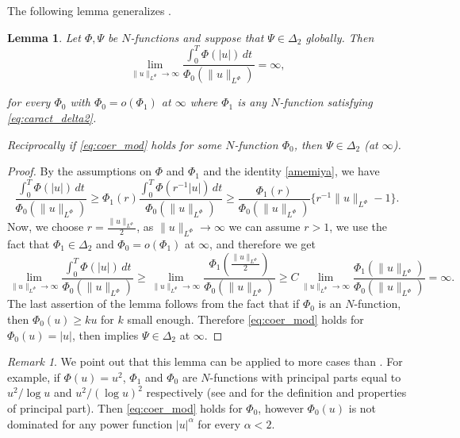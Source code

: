 \documentclass[twoside]{article}
\newtheorem{lem}[thm]{Lemma}
\theoremstyle{remark}
\newtheorem{comentario}{Remark}
\newcommand{\orlnor}{\|_{L^{\Phi}}}
\renewcommand{\geq}{\geqslant}
\begin{document}
The following lemma generalizes \cite[Lemma 5.2]{ABGMS2015}.

\begin{lem}\label{lem_coer}
Let $\Phi,\Psi$ be $N$-functions and suppose that $\Psi \in \Delta_2$ globally. Then
\begin{equation}\label{eq:coer_mod}
\lim\limits_{\|u\orlnor\to \infty}
\frac{\int_0^T \Phi(|u|)\,dt}{\Phi_0(\|u\orlnor)}=\infty,
\end{equation}


for every $\Phi_0$ with $\Phi_0=o(\Phi_1)$ at $\infty$ where $\Phi_1$ is any $N$-function satisfying \eqref{eq:caract_delta2}.

Reciprocally if  \eqref{eq:coer_mod} holds for some $N$-function $\Phi_0$,  then $\Psi\in\Delta_2$ (at $\infty$). 
\end{lem}

\begin{proof}
By the assumptions on $\Phi$ and $\Phi_1$  and the identity \eqref{amemiya}, we have
\[
\frac{\int_0^T \Phi(|u|)\,dt}{\Phi_0(\|u\orlnor)}\geq
\Phi_1(r) \frac{\int_0^T \Phi(r^{-1}|u|)\,dt}{\Phi_0(\|u\orlnor)}\geq
\frac{\Phi_1(r)}{\Phi_0(\|u\orlnor)}\{r^{-1}\|u\orlnor-1\}.
\]
Now, we choose $r=\frac{\|u\orlnor}{2}$, as $\|u\orlnor\to\infty$ we can assume $r>1$, we use the fact that $\Phi_1\in\Delta_2$ and
$\Phi_0=o(\Phi_1)$ at $\infty$, and 
therefore we get
\[
\lim\limits_{\|u\orlnor \to \infty} \frac{\int_0^T \Phi(|u|)\,dt}{\Phi_0(\|u\orlnor)}\geq
\lim\limits_{\|u\orlnor \to \infty} \frac{\Phi_1\left(\frac{\|u\orlnor}{2}\right)}{\Phi_0(\|u\orlnor)}
\geq
C \lim\limits_{\|u\orlnor \to \infty} \frac{\Phi_1(\|u\orlnor)}{\Phi_0(\|u\orlnor)}=\infty.
\]
The last assertion of the lemma follows from the fact that if $\Phi_0$ is an $N$-function, then $\Phi_0(u)\geq ku$ for  $k$ small enough. Therefore \eqref{eq:coer_mod} holds for $\Phi_0(u)=|u|$, then \cite[Lemma 5.2]{ABGMS2015}  implies  $\Psi\in\Delta_2$ at $\infty$.
\end{proof}


\begin{comentario}  We point out that this lemma can be applied to more cases than \cite[Lemma 5.2]{ABGMS2015}. For example, if $\Phi(u)=u^2$, $\Phi_1$ and $\Phi_0$ are  $N$-functions with principal parts equal to $u^2/\log u$ and $u^2/(\log u)^2$ respectively (see \cite[p. 16]{KR} and \cite[Section 7]{KR} for the definition and properties of principal part). Then  \eqref{eq:coer_mod} holds for $\Phi_0$, however $\Phi_0(u)$ is not dominated for any  power function $|u|^{\alpha}$ for every $\alpha<2$. 
\end{comentario}
\end{document}
